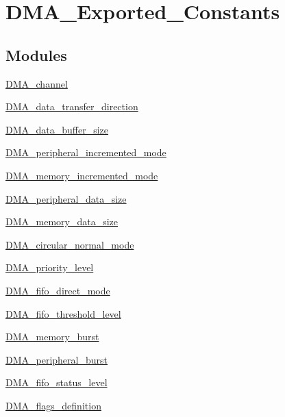 \hypertarget{group___d_m_a___exported___constants}{}\section{D\+M\+A\+\_\+\+Exported\+\_\+\+Constants}
\label{group___d_m_a___exported___constants}
\subsection*{Modules}
\begin{DoxyCompactItemize}
\item 
\hyperlink{group___d_m_a__channel}{D\+M\+A\+\_\+channel}
\item 
\hyperlink{group___d_m_a__data__transfer__direction}{D\+M\+A\+\_\+data\+\_\+transfer\+\_\+direction}
\item 
\hyperlink{group___d_m_a__data__buffer__size}{D\+M\+A\+\_\+data\+\_\+buffer\+\_\+size}
\item 
\hyperlink{group___d_m_a__peripheral__incremented__mode}{D\+M\+A\+\_\+peripheral\+\_\+incremented\+\_\+mode}
\item 
\hyperlink{group___d_m_a__memory__incremented__mode}{D\+M\+A\+\_\+memory\+\_\+incremented\+\_\+mode}
\item 
\hyperlink{group___d_m_a__peripheral__data__size}{D\+M\+A\+\_\+peripheral\+\_\+data\+\_\+size}
\item 
\hyperlink{group___d_m_a__memory__data__size}{D\+M\+A\+\_\+memory\+\_\+data\+\_\+size}
\item 
\hyperlink{group___d_m_a__circular__normal__mode}{D\+M\+A\+\_\+circular\+\_\+normal\+\_\+mode}
\item 
\hyperlink{group___d_m_a__priority__level}{D\+M\+A\+\_\+priority\+\_\+level}
\item 
\hyperlink{group___d_m_a__fifo__direct__mode}{D\+M\+A\+\_\+fifo\+\_\+direct\+\_\+mode}
\item 
\hyperlink{group___d_m_a__fifo__threshold__level}{D\+M\+A\+\_\+fifo\+\_\+threshold\+\_\+level}
\item 
\hyperlink{group___d_m_a__memory__burst}{D\+M\+A\+\_\+memory\+\_\+burst}
\item 
\hyperlink{group___d_m_a__peripheral__burst}{D\+M\+A\+\_\+peripheral\+\_\+burst}
\item 
\hyperlink{group___d_m_a__fifo__status__level}{D\+M\+A\+\_\+fifo\+\_\+status\+\_\+level}
\item 
\hyperlink{group___d_m_a__flags__definition}{D\+M\+A\+\_\+flags\+\_\+definition}

\end{DoxyCompactItemize}

